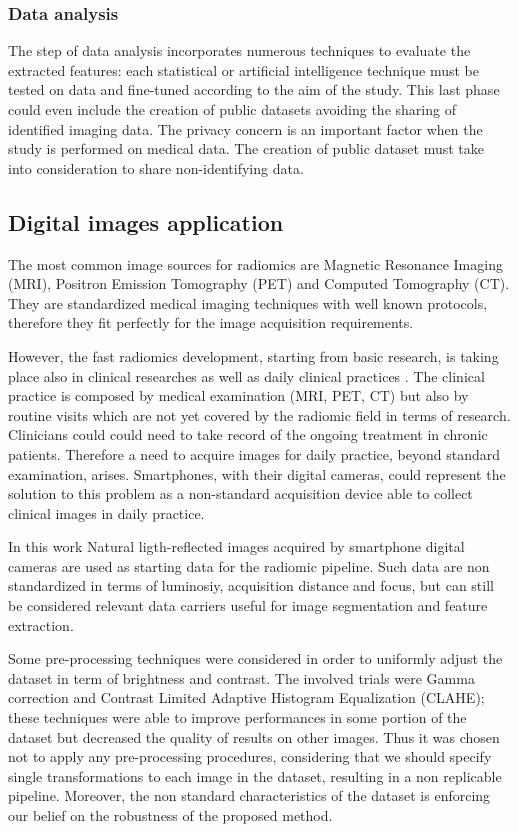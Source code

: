 \documentclass[../main.tex]{subfiles}
\begin{document}
\subsubsection{Data analysis}

The step of data analysis incorporates numerous techniques to evaluate the extracted features: each statistical or artificial intelligence technique must be tested on data and fine-tuned according to the aim of the study.
This last phase could even include the creation of public datasets avoiding the sharing of identified imaging data. 
The privacy concern is an important factor when the study is performed on medical data.
The creation of public dataset must take into consideration to share non-identifying data.


\subsection{Digital images application}

The most common image sources for radiomics are Magnetic Resonance Imaging (MRI), Positron Emission Tomography (PET) and  Computed Tomography (CT). 
They are standardized medical imaging techniques with well known protocols, therefore they fit perfectly for the image acquisition requirements.

However, the fast radiomics development, starting from basic research, is taking place also in clinical researches as well as daily clinical practices \cite{gillies2016radiomics-more-than-images}. 
The clinical practice is composed by medical examination (MRI, PET, CT) but also by routine visits which are not yet covered by the radiomic field in terms of research.
Clinicians could could need to take record of the ongoing treatment in chronic patients.
Therefore a need to acquire images for daily practice, beyond standard examination, arises.
Smartphones, with their digital cameras, could represent the solution to this problem as a non-standard acquisition device able to collect clinical images in daily practice.

In this work Natural ligth-reflected images acquired by smartphone digital cameras are used as starting data for the radiomic pipeline. Such data are non standardized in terms of luminosiy, acquisition distance and focus, but can still be considered relevant data carriers useful for image segmentation and feature extraction.

Some pre-processing techniques were considered in order to uniformly adjust the dataset in term of brightness and contrast.
The involved trials  were Gamma correction and Contrast Limited Adaptive Histogram Equalization (CLAHE); these techniques were able to improve performances in some portion of the dataset but decreased the quality of  results on other images.
Thus it was chosen not to apply any pre-processing procedures, considering that we should specify single transformations to each image in the dataset, resulting in a non replicable pipeline.
Moreover, the non standard characteristics of the dataset is enforcing our belief on the robustness of the proposed method.
\end{document}
